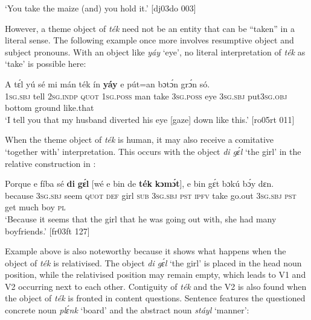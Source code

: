 \glt ‘You take the maize (and) you hold it.’ [dj03do 003]
\z

However, a theme object of \textit{ték} need not be an entity that can be “taken” in a literal sense. The following example once more involves resumptive object and subject pronouns. With an object like \textit{yáy} ‘eye’, no literal interpretation of \textit{ték} as ‘take’ is possible here: 


\ea%
    \label{ex:key:1566}
    \gll A    tɛ́l  yú    sé    mi    mán  ték    ín    \textbf{yáy}  
e    pút=an    bɔtɔ́n  grɔ́n    só.\\
\textsc{1sg.sbj}  tell  \textsc{2sg.indp}  \textsc{quot}    \textsc{1sg.poss}  man    take    \textsc{3sg.poss}  eye  
\textsc{3sg.sbj}  put\textsc{3sg.obj}  bottom  ground  like.that\\

\glt ‘I tell you that my husband diverted his eye [gaze] down like this.’ [ro05rt 011]
\z

When the theme object of \textit{ték} is human, it may also receive a comitative ‘together with’ interpretation. This occurs with the object \textit{di gɛ́l} ‘the girl’ in the relative construction{\fff} in : 


\ea%
    \label{ex:key:1567}
    \gll Porque  e    fíba    sé    \textbf{di}  \textbf{gɛ́l}  [wé  e    bin  de  \textbf{ték}    \textbf{kɔmɔ́t}],
e    bin  gɛ́t  bɔkú  bɔ́y  dɛn.\\
because  \textsc{3sg.sbj}  seem  \textsc{quot}    \textsc{def}  girl   \phantom{[}\textsc{sub}  \textsc{3sg.sbj}  \textsc{pst}  \textsc{ipfv}  take    go.out
\textsc{3sg.sbj}  \textsc{pst}  get  much  boy  \textsc{pl}\\

\glt ‘Because it seems that the girl that he was going out with, she had many boyfriends.’
[fr03ft 127]
\z

Example  above is also noteworthy because it shows what happens when the object of \textit{ték} is relativised. The object \textit{di gɛ́l} ‘the girl’ is placed in the head noun position, while the relativised position may remain empty, which leads to V1 and V2 occurring next to each other. Contiguity of \textit{ték} and the V2 is also found when the object of \textit{ték} is fronted in content questions{\fff}. Sentence  features the questioned concrete noun \textit{plɛ́nk} ‘board’ and  the abstract noun \textit{stáyl} ‘manner’: 


